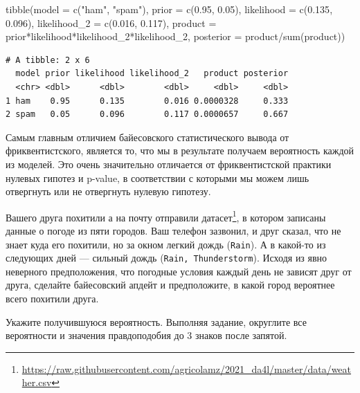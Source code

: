 \documentclass[
]{book}
\makeatletter
\newenvironment{Shaded}{\begin{snugshade}}{\end{snugshade}}
\newcommand{\AttributeTok}[1]{\textcolor[rgb]{0.77,0.63,0.00}{#1}}
\newcommand{\FloatTok}[1]{\textcolor[rgb]{0.00,0.00,0.81}{#1}}
\newcommand{\FunctionTok}[1]{\textcolor[rgb]{0.00,0.00,0.00}{#1}}
\newcommand{\NormalTok}[1]{#1}
\newcommand{\SpecialCharTok}[1]{\textcolor[rgb]{0.00,0.00,0.00}{#1}}
\newcommand{\StringTok}[1]{\textcolor[rgb]{0.31,0.60,0.02}{#1}}
\renewcommand{\href}[2]{#2\footnote{\url{#1}}}
\newenvironment{kframe}{%
    \medskip{}
    \setlength{\fboxsep}{.8em}
    \def\at@end@of@kframe{}%
    \ifinner\ifhmode%
    \def\at@end@of@kframe{\end{minipage}}%
    \begin{minipage}{\columnwidth}%
    \fi\fi%
    \def\FrameCommand##1{\hskip\@totalleftmargin \hskip-\fboxsep
    \colorbox{shadecolor}{##1}\hskip-\fboxsep
        \hskip-\linewidth \hskip-\@totalleftmargin \hskip\columnwidth}%
    \MakeFramed {\advance\hsize-\width
      \@totalleftmargin\z@ \linewidth\hsize
      \@setminipage}}%
  {\par\unskip\endMakeFramed%
    \at@end@of@kframe}
\newenvironment{rmdblock}[1]
  {
    \begin{itemize}
    \renewcommand{\labelitemi}{
      \raisebox{-.7\height}[0pt][0pt]{
        {\setkeys{Gin}{width=3em,keepaspectratio}\texttt{[image: images/\#1]}}
        }
        }
        \setlength{\fboxsep}{1em}
        \begin{kframe}
        \item
      }
      {
        \end{kframe}
        \end{itemize}
      }
\newenvironment{rmdtask}
      {\begin{rmdblock}{task}}
      {\end{rmdblock}}
\makeatother
\begin{document}
\begin{Shaded}
\begin{Highlighting}[]
\FunctionTok{tibble}\NormalTok{(}\AttributeTok{model =} \FunctionTok{c}\NormalTok{(}\StringTok{"ham"}\NormalTok{, }\StringTok{"spam"}\NormalTok{),}
       \AttributeTok{prior =} \FunctionTok{c}\NormalTok{(}\FloatTok{0.95}\NormalTok{, }\FloatTok{0.05}\NormalTok{),}
       \AttributeTok{likelihood =} \FunctionTok{c}\NormalTok{(}\FloatTok{0.135}\NormalTok{, }\FloatTok{0.096}\NormalTok{),}
       \AttributeTok{likelihood\_2 =} \FunctionTok{c}\NormalTok{(}\FloatTok{0.016}\NormalTok{, }\FloatTok{0.117}\NormalTok{),}
       \AttributeTok{product =}\NormalTok{ prior}\SpecialCharTok{*}\NormalTok{likelihood}\SpecialCharTok{*}\NormalTok{likelihood\_2}\SpecialCharTok{*}\NormalTok{likelihood\_2,}
       \AttributeTok{posterior =}\NormalTok{ product}\SpecialCharTok{/}\FunctionTok{sum}\NormalTok{(product))}
\end{Highlighting}
\end{Shaded}

\begin{verbatim}
# A tibble: 2 x 6
  model prior likelihood likelihood_2   product posterior
  <chr> <dbl>      <dbl>        <dbl>     <dbl>     <dbl>
1 ham    0.95      0.135        0.016 0.0000328     0.333
2 spam   0.05      0.096        0.117 0.0000657     0.667
\end{verbatim}

Самым главным отличием байесовского статистического вывода от фриквентистского, является то, что мы в результате получаем вероятность каждой из моделей. Это очень значительно отличается от фриквентистской практики нулевых гипотез и p-value, в соответствии с которыми мы можем лишь отвергнуть или не отвергнуть нулевую гипотезу.

\begin{rmdtask}
Вашего друга похитили а на почту отправили
\href{https://raw.githubusercontent.com/agricolamz/2021_da4l/master/data/weather.csv}{датасет},
в котором записаны данные о погоде из пяти городов. Ваш телефон
зазвонил, и друг сказал, что не знает куда его похитили, но за окном
легкий дождь (\texttt{Rain}). А в какой-то из следующих дней --- сильный
дождь (\texttt{Rain,\ Thunderstorm}). Исходя из явно неверного
предположения, что погодные условия каждый день не зависят друг от
друга, сделайте байесовский апдейт и предположите, в какой город
вероятнее всего похитили друга.
\end{rmdtask}

\begin{rmdtask}
Укажите получившуюся вероятность. Выполняя задание, округлите все
вероятности и значения правдоподобия до 3 знаков после запятой.
\end{rmdtask}
\end{document}
